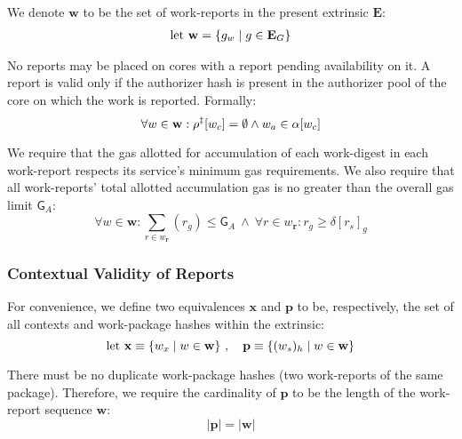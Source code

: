 We denote $\mathbf{w}$ to be the set of work-reports in the present extrinsic $\mathbf{E}$:
\begin{align}\label{eq:incomingworkreports}
  \text{let}\ \mathbf{w} = \{ g_w \mid g \in \mathbf{E}_G \}
\end{align}

No reports may be placed on cores with a report pending availability on it. A report is valid only if the authorizer hash is present in the authorizer pool of the core on which the work is reported. Formally:
\begin{equation}\label{eq:reportcoresareunusedortimedout}
  \forall w \in \mathbf{w} :
    \rho^\ddagger[w_c] = \emptyset \wedge w_a \in \alpha[w_c]
\end{equation}

We require that the gas allotted for accumulation of each work-digest in each work-report respects its service's minimum gas requirements. We also require that all work-reports' total allotted accumulation gas is no greater than the overall gas limit $\mathsf{G}_A$:
\begin{equation}
  \forall w \in \mathbf{w}:
    \sum_{r \in w_\mathbf{r}}\!(r_g) \le \mathsf{G}_A \ \wedge \ 
    \forall r \in w_\mathbf{r}: r_g \ge \delta[r_s]_g
\end{equation}












\subsubsection{Contextual Validity of Reports}\label{sec:contextualvalidity}

For convenience, we define two equivalences $\mathbf{x}$ and $\mathbf{p}$ to be, respectively, the set of all contexts and work-package hashes within the extrinsic:
\begin{equation}
    \text{let } \mathbf{x} \equiv \{ w_x \mid w \in \mathbf{w} \}\ ,\quad
    \mathbf{p} \equiv \{ (w_s)_h \mid w \in \mathbf{w} \}
\end{equation}

There must be no duplicate work-package hashes (\ie two work-reports of the same package). Therefore, we require the cardinality of $\mathbf{p}$ to be the length of the work-report sequence $\mathbf{w}$:
\begin{equation}
  |\mathbf{p}| = |\mathbf{w}|
\end{equation}

